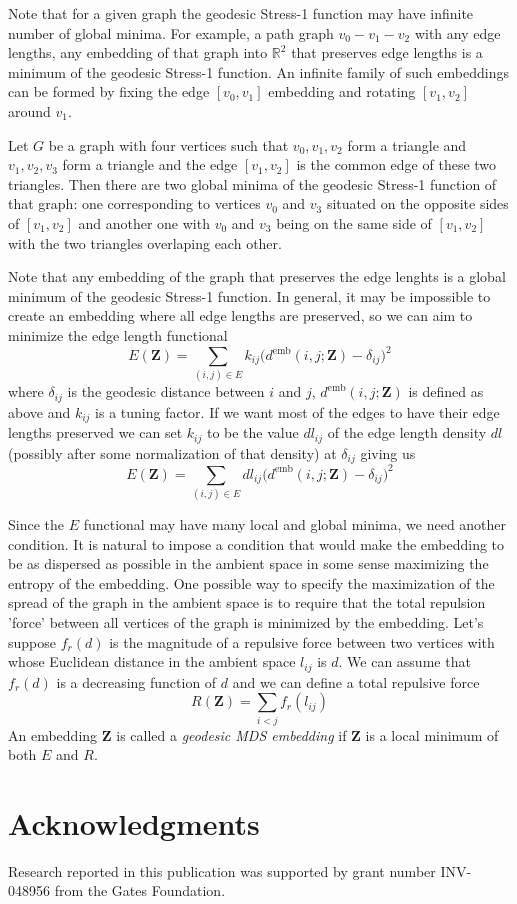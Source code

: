 \documentclass[11pt]{article}
\theoremstyle{definition}
\newcommand{\acks}[1]{%
  \section*{Acknowledgments}%
  #1%
}
\newcommand{\bZ}{\mathbf{Z}}
\newcommand{\demb}{d^{\mathrm{emb}}}
\begin{document}
Note that for a given graph the geodesic Stress-1 function may have infinite
number of global minima. For example, a path graph $v_{0} - v_{1} - v_{2}$ with
any edge lengths, any embedding of that graph into $\mathbb{R}^{2}$ that
preserves edge lengths is a minimum of the geodesic Stress-1 function. An
infinite family of such embeddings can be formed by fixing the edge
$[v_{0},v_{1}]$ embedding and rotating $[v_{1},v_{2}]$ around $v_{1}$.

Let $G$ be a graph with four vertices such that $v_{0}, v_{1}, v_{2}$ form a
triangle and $v_{1}, v_{2}, v_{3}$ form a triangle and the edge $[v_{1},v_{2}]$
is the common edge of these two triangles. Then there are two global minima of
the geodesic Stress-1 function of that graph: one corresponding to vertices
$v_{0}$ and $v_{3}$ situated on the opposite sides of $[v_{1},v_{2}]$ and
another one with $v_{0}$ and $v_{3}$ being on the same side of $[v_{1},v_{2}]$
with the two triangles overlaping each other.

Note that any embedding of the graph that preserves the edge lenghts is a global
minimum of the geodesic Stress-1 function. In general, it may be impossible to
create an embedding where all edge lengths are preserved, so we can aim to
minimize the edge length functional
\[
  E(\bZ) = \sum_{(i,j) \in E} k_{ij} \bigl(\demb(i,j;\bZ) - \delta_{ij}\bigr)^2
\]
where $\delta_{ij}$ is the geodesic distance between $i$ and $j$,
$\demb(i,j;\bZ)$ is defined as above and $k_{ij}$ is a tuning factor. If we want
most of the edges to have their edge lengths preserved we can set $k_{ij}$ to be
the value $dl_{ij}$ of the edge length density $dl$ (possibly after some
normalization of that density) at $\delta_{ij}$ giving us
\[
  E(\bZ) = \sum_{(i,j) \in E} dl_{ij} \bigl(\demb(i,j;\bZ) - \delta_{ij}\bigr)^2
\]

Since the $E$ functional may have many local and global minima, we need another
condition. It is natural to impose a condition that would make the embedding to
be as dispersed as possible in the ambient space in some sense maximizing the
entropy of the embedding. One possible way to specify the maximization of the
spread of the graph in the ambient space is to require that the total repulsion
'force' between all vertices of the graph is minimized by the embedding. Let's
suppose $f_{r}(d)$ is the magnitude of a repulsive force between two vertices
with whose Euclidean distance in the ambient space $l_{ij}$ is $d$. We can
assume that $f_{r}(d)$ is a decreasing function of $d$ and we can define a total
repulsive force
\[
  R(\bZ) = \sum_{i < j} f_{r}(l_{ij})
\]
An embedding $\bZ$ is called a \emph{geodesic MDS embedding} if $\bZ$ is a local
minimum of both $E$ and $R$.


\acks{Research reported in this publication was supported by grant number INV-048956 from the Gates Foundation.}



\end{document}
